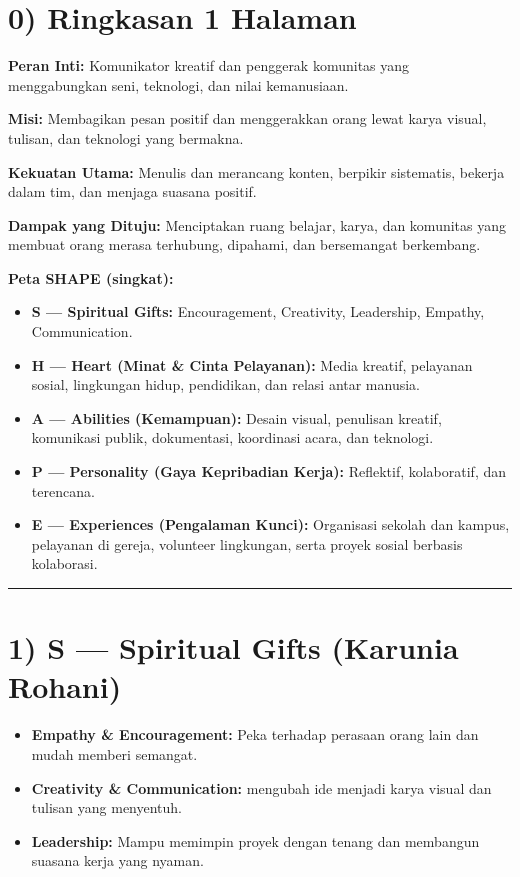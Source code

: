 \documentclass[
  letterpaper,
  DIV=11,
  numbers=noendperiod]{scrreprt}
\providecommand{\tightlist}{%
  \setlength{\itemsep}{0pt}\setlength{\parskip}{0pt}}
\begin{document}
\section{0) Ringkasan 1 Halaman}\label{ringkasan-1-halaman}

\textbf{Peran Inti:} Komunikator kreatif dan penggerak komunitas yang
menggabungkan seni, teknologi, dan nilai kemanusiaan.

\textbf{Misi:} Membagikan pesan positif dan menggerakkan orang lewat
karya visual, tulisan, dan teknologi yang bermakna.

\textbf{Kekuatan Utama:} Menulis dan merancang konten, berpikir
sistematis, bekerja dalam tim, dan menjaga suasana positif.

\textbf{Dampak yang Dituju:} Menciptakan ruang belajar, karya, dan
komunitas yang membuat orang merasa terhubung, dipahami, dan bersemangat
berkembang.

\textbf{Peta SHAPE (singkat):}

\begin{itemize}
\tightlist
\item
  \textbf{S --- Spiritual Gifts:} Encouragement, Creativity, Leadership,
  Empathy, Communication.
\item
  \textbf{H --- Heart (Minat \& Cinta Pelayanan):} Media kreatif,
  pelayanan sosial, lingkungan hidup, pendidikan, dan relasi antar
  manusia.
\item
  \textbf{A --- Abilities (Kemampuan):} Desain visual, penulisan
  kreatif, komunikasi publik, dokumentasi, koordinasi acara, dan
  teknologi.
\item
  \textbf{P --- Personality (Gaya Kepribadian Kerja):} Reflektif,
  kolaboratif, dan terencana.
\item
  \textbf{E --- Experiences (Pengalaman Kunci):} Organisasi sekolah dan
  kampus, pelayanan di gereja, volunteer lingkungan, serta proyek sosial
  berbasis kolaborasi.
\end{itemize}

\begin{center}\rule{0.5\linewidth}{0.5pt}\end{center}

\section{1) S --- Spiritual Gifts (Karunia
Rohani)}\label{s-spiritual-gifts-karunia-rohani}

\begin{itemize}
\tightlist
\item
  \textbf{Empathy \& Encouragement:} Peka terhadap perasaan orang lain
  dan mudah memberi semangat.
\item
  \textbf{Creativity \& Communication:} mengubah ide menjadi karya
  visual dan tulisan yang menyentuh.
\item
  \textbf{Leadership:} Mampu memimpin proyek dengan tenang dan membangun
  suasana kerja yang nyaman.
\end{itemize}
\end{document}
